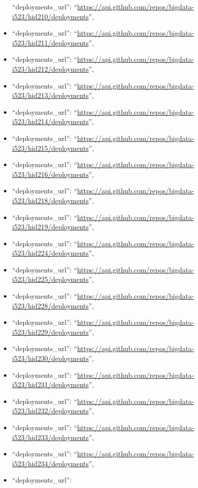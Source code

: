 \begin{itemize}
  ``deployments\_url'':
  ``\url{https://api.github.com/repos/bigdata-i523/hid210/deployments}'',
\item
  ``deployments\_url'':
  ``\url{https://api.github.com/repos/bigdata-i523/hid211/deployments}'',
\item
  ``deployments\_url'':
  ``\url{https://api.github.com/repos/bigdata-i523/hid212/deployments}'',
\item
  ``deployments\_url'':
  ``\url{https://api.github.com/repos/bigdata-i523/hid213/deployments}'',
\item
  ``deployments\_url'':
  ``\url{https://api.github.com/repos/bigdata-i523/hid214/deployments}'',
\item
  ``deployments\_url'':
  ``\url{https://api.github.com/repos/bigdata-i523/hid215/deployments}'',
\item
  ``deployments\_url'':
  ``\url{https://api.github.com/repos/bigdata-i523/hid216/deployments}'',
\item
  ``deployments\_url'':
  ``\url{https://api.github.com/repos/bigdata-i523/hid218/deployments}'',
\item
  ``deployments\_url'':
  ``\url{https://api.github.com/repos/bigdata-i523/hid219/deployments}'',
\item
  ``deployments\_url'':
  ``\url{https://api.github.com/repos/bigdata-i523/hid224/deployments}'',
\item
  ``deployments\_url'':
  ``\url{https://api.github.com/repos/bigdata-i523/hid225/deployments}'',
\item
  ``deployments\_url'':
  ``\url{https://api.github.com/repos/bigdata-i523/hid228/deployments}'',
\item
  ``deployments\_url'':
  ``\url{https://api.github.com/repos/bigdata-i523/hid229/deployments}'',
\item
  ``deployments\_url'':
  ``\url{https://api.github.com/repos/bigdata-i523/hid230/deployments}'',
\item
  ``deployments\_url'':
  ``\url{https://api.github.com/repos/bigdata-i523/hid231/deployments}'',
\item
  ``deployments\_url'':
  ``\url{https://api.github.com/repos/bigdata-i523/hid232/deployments}'',
\item
  ``deployments\_url'':
  ``\url{https://api.github.com/repos/bigdata-i523/hid233/deployments}'',
\item
  ``deployments\_url'':
  ``\url{https://api.github.com/repos/bigdata-i523/hid234/deployments}'',
\item
  ``deployments\_url'':

\end{itemize}
